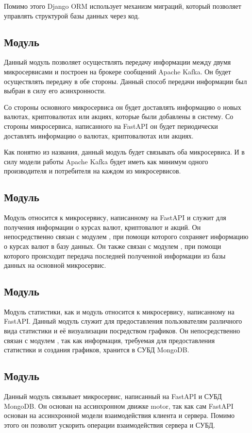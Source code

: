 Помимо этого Django ORM использует механизм миграций, который позволяет управлять структурой базы данных через код.

\subsection{Модуль \moduleCommunication}\label{subsec:sys:module-communication}
Данный модуль позволяет осуществлять передачу информации между двумя микросервисами и построен на брокере сообщений Apache Kafka.
Он будет осуществлять передачу в обе стороны.
Данный способ передачи информации был выбран в силу его асинхронности.

Со стороны основного микросервиса он будет доставлять информацию о новых валютах, криптовалютах или акциях, которые были добавлены в систему.
Со стороны микросервиса, написанного на FastAPI он будет периодически доставлять информацию о валютах, криптовалютах или акциях.

Как понятно из названия, данный модуль будет связывать оба микросервиса.
И в силу модели работы Apache Kafka будет иметь как минимум одного производителя и потребителя на каждом из микросервисов.

\subsection{Модуль \moduleParsing}
Модуль \moduleParsing относится к микросервису, написанному на FastAPI и служит для получения информации о курсах валют, криптовалют и акций.
Он непосредственно связан с модулем \moduleCommunicationMongoDB, при помощи которого сохраняет информацию о курсах валют в базу данных.
Он также связан с модулем \moduleCommunication, при помощи которого происходит передача последней полученной информации из базы данных на основной микросервис.

\subsection{Модуль \moduleStatistics}
Модуль статистики, как и модуль \moduleParsing относится к микросервису, написанному на FastAPI.
Данный модуль служит для предоставления пользователям различного вида статистики и её визуализации посредством графиков.
Он непосредственно связан с модулем \moduleCommunicationMongoDB, так как информация,
требуемая для предоставления статистики и создания графиков, хранится в СУБД MongoDB.

\subsection{Модуль \moduleCommunicationMongoDB}
Данный модуль связывает микросервис, написанный на FastAPI и СУБД MongoDB.
Он основан на ассинхронном движке motor, так как сам FastAPI основан на ассинхронной модели взаимодействия клиента и сервера.
Помимо этого он позволит ускорить операции взаимодействия сервера и СУБД.
